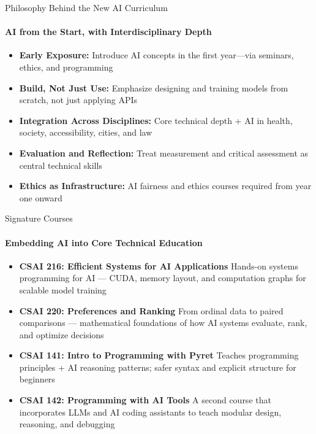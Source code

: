 \documentclass[compress]{beamer}
\begin{document}
\begin{frame}{Philosophy Behind the New AI Curriculum}
\framesubtitle{AI from the Start, with Interdisciplinary Depth}
\begin{itemize}
  \item \textbf{Early Exposure:}  
        Introduce AI concepts in the first year—via seminars, ethics, and programming

  \item \textbf{Build, Not Just Use:}  
        Emphasize designing and training models from scratch, not just applying APIs

  \item \textbf{Integration Across Disciplines:}  
        Core technical depth + AI in health, society, accessibility, cities, and law

  \item \textbf{Evaluation and Reflection:}  
        Treat measurement and critical assessment as central technical skills

  \item \textbf{Ethics as Infrastructure:}  
        AI fairness and ethics courses required from year one onward
\end{itemize}
\end{frame}

\begin{frame}{Signature Courses}
\framesubtitle{Embedding AI into Core Technical Education}
\begin{itemize}
  \item \textbf{CSAI 216: Efficient Systems for AI Applications}  
        Hands-on systems programming for AI — CUDA, memory layout, and computation graphs for scalable model training

  \item \textbf{CSAI 220: Preferences and Ranking}  
        From ordinal data to paired comparisons — mathematical foundations of how AI systems evaluate, rank, and optimize decisions

  \item \textbf{CSAI 141: Intro to Programming with Pyret}  
        Teaches programming principles + AI reasoning patterns; safer syntax and explicit structure for beginners

  \item \textbf{CSAI 142: Programming with AI Tools}  
        A second course that incorporates LLMs and AI coding assistants to teach modular design, reasoning, and debugging
\end{itemize}
\end{frame}
\end{document}
